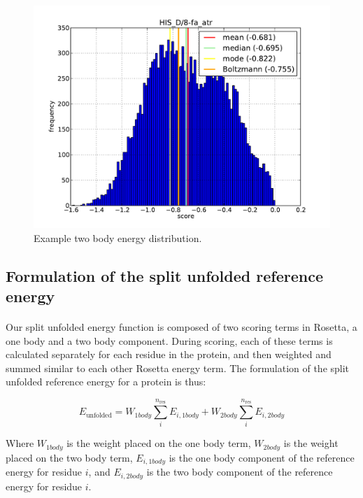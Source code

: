 \begin{figure}
  \includegraphics[width=\linewidth]{Figures/test.png}
  \caption{Example two body energy distribution.}
  \label{fig:tbaedist}
\end{figure}


\subsection{Formulation of the split unfolded reference energy}
\paragraph{}
Our split unfolded energy function is composed of two scoring terms in Rosetta, a one body and a two body component.
During scoring, each of these terms is calculated separately for each residue in the protein, and then weighted and summed similar to each other Rosetta energy term.
The formulation of the split unfolded reference energy for a protein is thus:

\begin{equation}
E_{\text{unfolded}} =  W_{1body} \sum_{i}^{n_{\text{res}}} E_{i,1body} +  W_{2body} \sum_{i}^{n_{\text{res}}} E_{i,2body}
\end{equation}

Where $W_{1body}$ is the weight placed on the one body term, $W_{2body}$ is the weight placed on the two body term, $E_{i,1body}$ is the one body component of the reference energy for residue $i$, and $E_{i,2body}$ is the two body component of the reference energy for residue $i$.

